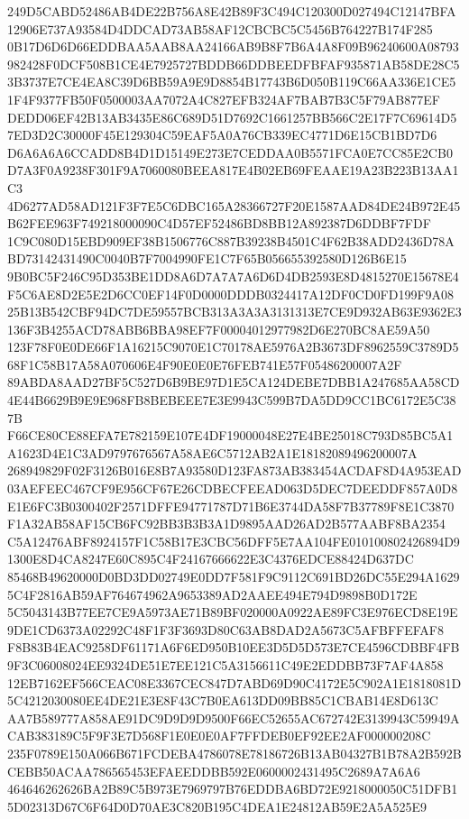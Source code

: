 \documentclass[UTF8,fontset=fandol,zihao=-4,a4paper]{ctexart}
\begin{document}
{{249D5CABD52486AB4DE22B756A8E42B89F3C494C120300D027494C12147BFA12906E737A93584D4DDCAD73AB58AF12CBCBC5C5456B764227B174F285
0B17D6D6D66EDDBAA5AAB8AA24166AB9B8F7B6A4A8F09B96240600A08793982428F0DCF508B1CE4E7925727BDDB66DDBEEDFBFAF935871AB58DE28C5
3B3737E7CE4EA8C39D6BB59A9E9D8854B17743B6D050B119C66AA336E1CE51F4F9377FB50F0500003AA7072A4C827EFB324AF7BAB7B3C5F79AB877EF
DEDD06EF42B13AB3435E86C689D51D7692C1661257BB566C2E17F7C69614D57ED3D2C30000F45E129304C59EAF5A0A76CB339EC4771D6E15CB1BD7D6
D6A6A6A6CCADD8B4D1D15149E273E7CEDDAA0B5571FCA0E7CC85E2CB0D7A3F0A9238F301F9A7060080BEEA817E4B02EB69FEAAE19A23B223B13AA1C3
4D6277AD58AD121F3F7E5C6DBC165A28366727F20E1587AAD84DE24B972E45B62FEE963F749218000090C4D57EF52486BD8BB12A892387D6DDBF7FDF
1C9C080D15EBD909EF38B1506776C887B39238B4501C4F62B38ADD2436D78ABD73142431490C0040B7F7004990FE1C7F65B056655392580D126B6E15
9B0BC5F246C95D353BE1DD8A6D7A7A7A6D6D4DB2593E8D4815270E15678E4F5C6AE8D2E5E2D6CC0EF14F0D0000DDDB0324417A12DF0CD0FD199F9A08
25B13B542CBF94DC7DE59557BCB313A3A3A3131313E7CE9D932AB63E9362E3136F3B4255ACD78ABB6BBA98EF7F00004012977982D6E270BC8AE59A50
123F78F0E0DE66F1A16215C9070E1C70178AE5976A2B3673DF8962559C3789D568F1C58B17A58A070606E4F90E0E0E76FEB741E57F05486200007A2F
89ABDA8AAD27BF5C527D6B9BE97D1E5CA124DEBE7DBB1A247685AA58CD4E44B6629B9E9E968FB8BEBEEE7E3E9943C599B7DA5DD9CC1BC6172E5C387B
F66CE80CE88EFA7E782159E107E4DF19000048E27E4BE25018C793D85BC5A1A1623D4E1C3AD9797676567A58AE6C5712AB2A1E18182089496200007A
268949829F02F3126B016E8B7A93580D123FA873AB383454ACDAF8D4A953EAD03AEFEEC467CF9E956CF67E26CDBECFEEAD063D5DEC7DEEDDF857A0D8
E1E6FC3B0300402F2571DFFE94771787D71B6E3744DA58F7B37789F8E1C3870F1A32AB58AF15CB6FC92BB3B3B3A1D9895AAD26AD2B577AABF8BA2354
C5A12476ABF8924157F1C58B17E3CBC56DFF5E7AA104FE010100802426894D91300E8D4CA8247E60C895C4F24167666622E3C4376EDCE88424D637DC
85468B49620000D0BD3DD02749E0DD7F581F9C9112C691BD26DC55E294A16295C4F2816AB59AF764674962A9653389AD2AAEE494E794D9898B0D172E
5C5043143B77EE7CE9A5973AE71B89BF020000A0922AE89FC3E976ECD8E19E9DE1CD6373A02292C48F1F3F3693D80C63AB8DAD2A5673C5AFBFFEFAF8
F8B83B4EAC9258DF61171A6F6ED950B10EE3D5D5D573E7CE4596CDBBF4FB9F3C06008024EE9324DE51E7EE121C5A3156611C49E2EDDBB73F7AF4A858
12EB7162EF566CEAC08E3367CEC847D7ABD69D90C4172E5C902A1E1818081D5C4212030080EE4DE21E3E8F43C7B0EA613DD09BB85C1CBAB14E8D613C
AA7B589777A858AE91DC9D9D9D9500F66EC52655AC672742E3139943C59949ACAB383189C5F9F3E7D568F1E0E0E0AF7FFDEB0EF92EE2AF000000208C
235F0789E150A066B671FCDEBA4786078E78186726B13AB04327B1B78A2B592BCEBB50ACAA786565453EFAEEDDBB592E0600002431495C2689A7A6A6
464646262626BA2B89C5B973E7969797B76EDDBA6BD72E9218000050C51DFB15D02313D67C6F64D0D70AE3C820B195C4DEA1E24812AB59E2A5A525E9
}}
\end{document}
